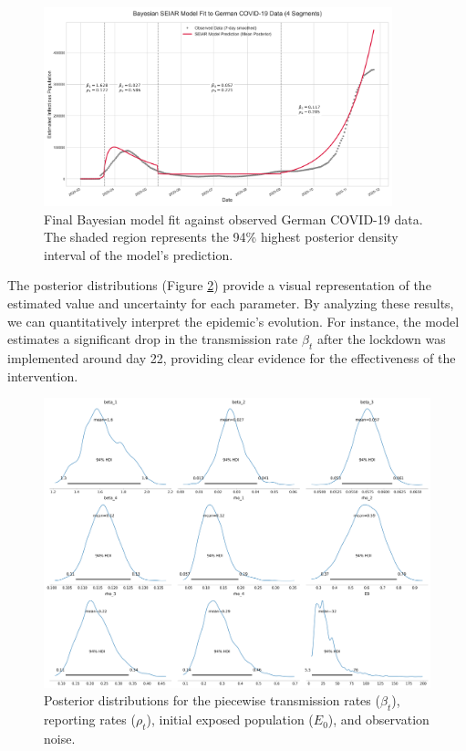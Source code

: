 \documentclass[12pt, a4paper]{article}
\begin{document}
\begin{figure}[h!]
    \centering
    \includegraphics[width=0.9\textwidth]{1/bayesian_fit_to_data.png}
    \caption{Final Bayesian model fit against observed German COVID-19 data. The shaded region represents the 94\% highest posterior density interval of the model's prediction.}
    \label{fig:bayesian_fit_2}
\end{figure}

The posterior distributions (Figure \ref{fig:posterior_plots_2}) provide a visual representation of the estimated value and uncertainty for each parameter. By analyzing these results, we can quantitatively interpret the epidemic's evolution. For instance, the model estimates a significant drop in the transmission rate $\beta_t$ after the lockdown was implemented around day 22, providing clear evidence for the effectiveness of the intervention.

\begin{figure}[h!]
    \centering
    \includegraphics[width=\textwidth]{1/bayesian_posterior_plots.png}
    \caption{Posterior distributions for the piecewise transmission rates ($\beta_t$), reporting rates ($\rho_t$), initial exposed population ($E_0$), and observation noise.}
    \label{fig:posterior_plots_2}
\end{figure}
\end{document}
